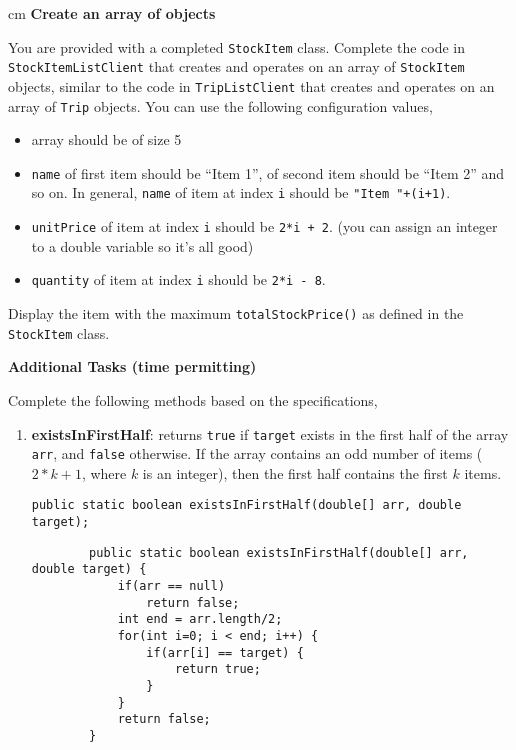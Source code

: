 \begin{questions}
 cm \question \textbf{Create an array of objects} \vskip 0.5cm

You are provided with a completed \texttt{StockItem} class. Complete the code in \texttt{StockItemListClient} that creates and operates on an array of \texttt{StockItem} objects, similar to the code in \texttt{TripListClient} that creates and operates on an array of \texttt{Trip} objects. You can use the following configuration values,

\begin{itemize}
\item array should be of size 5
\item \texttt{name} of first item should be ``Item 1'', of second item should be ``Item 2'' and so on. In general, \texttt{name} of item at index \texttt{i} should be \texttt{"Item "+(i+1)}.
\item \texttt{unitPrice} of item at index \texttt{i} should be \texttt{2*i + 2}. (you can assign an integer to a double variable so it's all good)
\item \texttt{quantity} of item at index \texttt{i} should be \texttt{2*i - 8}.
\end{itemize}

Display the item with the maximum \texttt{totalStockPrice()} as defined in the \texttt{StockItem} class.

\newpage \question \textbf{Additional Tasks (time permitting)} \vskip 0.5cm

Complete the following methods based on the specifications,

\begin{enumerate}
	\item \textbf{existsInFirstHalf}: returns \texttt{true} if \texttt{target} exists in the first half of the array \texttt{arr}, and \texttt{false} otherwise. If the array contains an odd number of items ($2*k + 1$, where $k$ is an integer), then the first half contains the first $k$ items.
	
\begin{lstlisting}
public static boolean existsInFirstHalf(double[] arr, double target);		
\end{lstlisting}
	
	\ifprintanswers
	\begin{lstlisting}
		public static boolean existsInFirstHalf(double[] arr, double target) {
			if(arr == null)
				return false;
			int end = arr.length/2;	
			for(int i=0; i < end; i++) {
				if(arr[i] == target) {
					return true;
				}
			}
			return false;
		}
	\end{lstlisting}
	\else
	\fi
	

\end{enumerate}
\end{questions}
